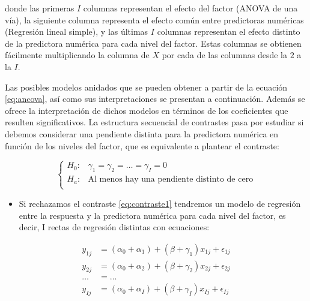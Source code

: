 \documentclass[
]{book}
\providecommand{\tightlist}{%
  \setlength{\itemsep}{0pt}\setlength{\parskip}{0pt}}
\theoremstyle{definition}
\theoremstyle{definition}
\theoremstyle{definition}
\theoremstyle{remark}
\begin{document}
donde las primeras \(I\) columnas representan el efecto del factor (ANOVA de una vía), la siguiente columna representa el efecto común entre predictoras numéricas (Regresión lineal simple), y las últimas \(I\) columnas representan el efecto distinto de la predictora numérica para cada nivel del factor. Estas columnas se obtienen fácilmente multiplicando la columna de \(X\) por cada de las columnas desde la \(2\) a la \(I\).

Las posibles modelos anidados que se pueden obtener a partir de la ecuación \eqref{eq:ancova}, así como sus interpretaciones se presentan a continuación. Además se ofrece la interpretación de dichos modelos en términos de los coeficientes que resulten significativos. La estructura secuencial de contrastes pasa por estudiar si debemos considerar una pendiente distinta para la predictora numérica en función de los niveles del factor, que es equivalente a plantear el contraste:

\begin{equation}
\left\{ 
\begin{array}{ll}
H_0: & \gamma_1 = \gamma_2 = \ldots = \gamma_I = 0\\
H_a: & \mbox{Al menos hay una pendiente distinto de cero}\\
\end{array}
\right.
\label{eq:contraste1}
\end{equation}

\begin{itemize}
\tightlist
\item
  Si rechazamos el contraste \eqref{eq:contraste1} tendremos un modelo de regresión entre la respuesta y la predictora numérica para cada nivel del factor, es decir, I rectas de regresión distintas con ecuaciones:
\end{itemize}

\begin{equation}
\begin{array}{ll}
y_{1j} &= (\alpha_0 + \alpha_1) + (\beta + \gamma_1) x_{1j} + \epsilon_{1j}\\
y_{2j} &= (\alpha_0 + \alpha_2) + (\beta + \gamma_2) x_{2j} + \epsilon_{2j}\\
\ldots &= \ldots \\
y_{Ij} &= (\alpha_0 + \alpha_I) + (\beta + \gamma_I) x_{Ij} + \epsilon_{Ij}\\
\end{array}
\label{eq:modeloancovaconinteraccion}
\end{equation}
\end{document}

